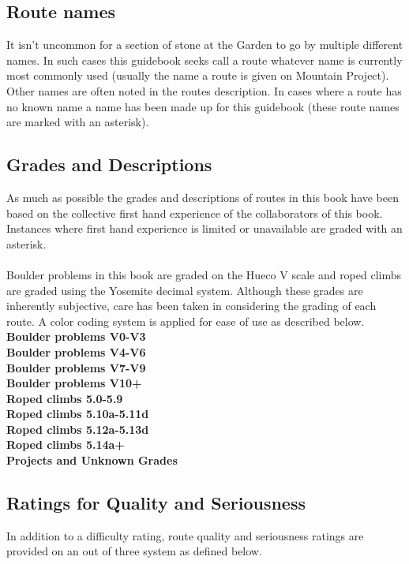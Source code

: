 \subsection*{Route names}
It isn't uncommon for a section of stone at the Garden to go by multiple different names. In such cases this guidebook seeks call a route whatever name is currently most commonly used (usually the name a route is given on Mountain Project). Other names are often noted in the routes description. In cases where a route has no known name a name has been made up for this guidebook (these route names are marked with an asterisk).

\subsection*{Grades and Descriptions}
As much as possible the grades and descriptions of routes in this book have been based on the collective first hand experience of the collaborators of this book. Instances where first hand experience is limited or unavailable are graded with an asterisk.\\
\\
Boulder problems in this book are graded on the Hueco V scale and roped climbs are graded using the Yosemite decimal system. Although these grades are inherently subjective, care has been taken in considering the grading of each route. A color coding system is applied for ease of use as described below.\\
\newline
\colorbox{green!20}{\textbf{Boulder problems V0-V3}}\\
\colorbox{RoyalBlue!20}{\textbf{Boulder problems V4-V6}}\\
\colorbox{Goldenrod!50}{\textbf{Boulder problems V7-V9}}\\
\colorbox{red!20}{\textbf{Boulder problems V10+}}\\
\colorbox{green!20}{\textbf{Roped climbs 5.0-5.9}}\\
\colorbox{RoyalBlue!20}{\textbf{Roped climbs 5.10a-5.11d}}\\
\colorbox{Goldenrod!50}{\textbf{Roped climbs 5.12a-5.13d}}\\
\colorbox{red!20}{\textbf{Roped climbs 5.14a+}}\\
\colorbox{black!20}{\textbf{Projects and Unknown Grades}}\\
\subsection*{Ratings for Quality and Seriousness}
In addition to a difficulty rating, route quality and seriousness ratings are provided on an out of three system as defined below.
